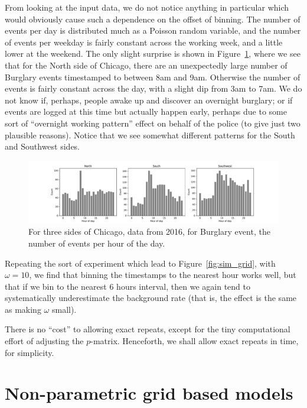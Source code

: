 \documentclass[twoside,a4paper]{article}
\theoremstyle{plain}
\theoremstyle{definition}
\begin{document}
From looking at the input data, we do not notice anything in particular which would
obviously cause such a dependence on the offset of binning.  The number of events per day
is distributed much as a Poisson random variable, and the number of events per weekday
is fairly constant across the working week, and a little lower at the weekend.  The
only slight surprise is shown in Figure~\ref{fig:by_hour_of_day}, where we see that
for the North side of Chicago, there
are an unexpectedly large number of Burglary events timestamped to between 8am and 9am.
Otherwise the number of events is fairly constant across the day, with a slight dip
from 3am to 7am.  We do not know if, perhaps, people awake up and discover an overnight
burglary; or if events are logged at this time but actually happen early, perhaps due
to some sort of ``overnight working pattern'' effect on behalf of the police (to give
just two plausible reasons).  Notice that we see somewhat different patterns for the
South and Southwest sides.

\begin{figure}
  \includegraphics[width=\textwidth]{../notebooks/events_by_hour.pdf}
  \caption{For three sides of Chicago, data from 2016, for Burglary event,
the number of events per hour of the day.}
  \label{fig:by_hour_of_day}
\end{figure}

Repeating the sort of experiment which lead to Figure~\ref{fig:sim_grid}, with $\omega=10$,
we find that binning the timestamps to the nearest hour works well, but that if we bin to
the nearest 6 hours interval, then we again tend to systematically underestimate the
background rate (that is, the effect is the same as making $\omega$ small).

There is no ``cost'' to allowing exact repeats, except for the tiny computational effort
of adjusting the $p$-matrix.  Henceforth, we shall allow exact repeats in time, for simplicity.





\section{Non-parametric grid based models}\label{sec:non_param_grid}
\end{document}
